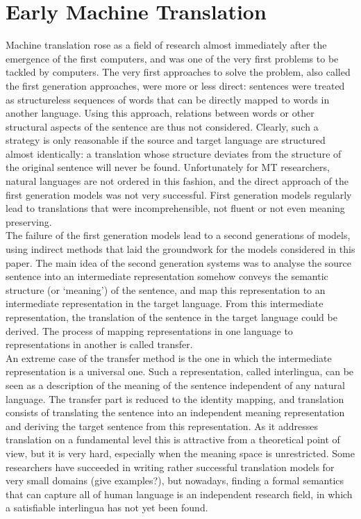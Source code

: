 \documentclass{report}
\theoremstyle{definition}
\theoremstyle{plain}
\begin{document}
\section{Early Machine Translation}
Machine translation rose as a field of research almost immediately after the emergence of the first computers, and was one of the very first problems to be tackled by computers. The very first approaches to solve the problem, also called the first generation approaches, were more or less direct: sentences were treated as structureless sequences of words that can be directly mapped to words in another language. Using this approach, relations between words or other structural aspects of the sentence are thus not considered. Clearly, such a strategy is only reasonable if the source and target language are structured almost identically: a translation whose structure deviates from the structure of the original sentence will never be found. Unfortunately for MT researchers, natural languages are not ordered in this fashion, and the direct approach of the first generation models was not very successful. First generation models regularly lead to translations that were incomprehensible, not fluent or not even meaning preserving.\\
The failure of the first generation models lead to a second generations of models, using indirect methods that laid the groundwork for the models considered in this paper. The main idea of the second generation systems was to analyse the source sentence into an intermediate representation somehow conveys the semantic structure (or `meaning') of the sentence, and map this representation to an intermediate representation in the target language. From this intermediate representation, the translation of the sentence in the target language could be derived. The process of mapping representations in one language to representations in another is called transfer.\\
An extreme case of the transfer method is the one in which the intermediate representation is a universal one. Such a representation, called interlingua, can be seen as a description of the meaning of the sentence independent of any natural language. The transfer part is reduced to the identity mapping, and translation consists of translating the sentence into an independent meaning representation and deriving the target sentence from this representation. As it addresses translation on a fundamental level this is attractive from a theoretical point of view, but it is very hard, especially when the meaning space is unrestricted. Some researchers have succeeded in writing rather successful translation models for very small domains (give examples?), but nowadays, finding a formal semantics that can capture all of human language is an independent research field, in which a satisfiable interlingua has not yet been found.
\end{document}
